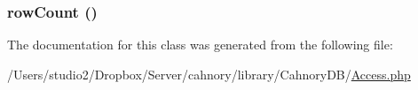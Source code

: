 \hypertarget{class_cahnory_d_b___access_82b073888555fc72e57142fe913db377}{
\subsubsection[{rowCount}]{\setlength{\rightskip}{0pt plus 5cm}rowCount ()}}
\label{class_cahnory_d_b___access_82b073888555fc72e57142fe913db377}




The documentation for this class was generated from the following file:\begin{CompactItemize}
\item 
/Users/studio2/Dropbox/Server/cahnory/library/CahnoryDB/\hyperlink{_access_8php}{Access.php}\end{CompactItemize}
